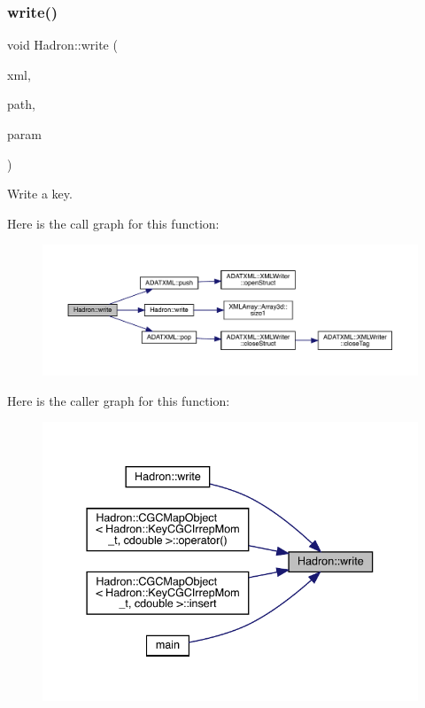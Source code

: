 \subsubsection{\texorpdfstring{write()}{write()}\hspace{0.1cm}{\footnotesize\ttfamily [24/95]}}
{\footnotesize\ttfamily void Hadron\+::write (\begin{DoxyParamCaption}\item[{\mbox{\hyperlink{classADATXML_1_1XMLWriter}{X\+M\+L\+Writer}} \&}]{xml,  }\item[{const std\+::string \&}]{path,  }\item[{const \mbox{\hyperlink{structHadron_1_1KeyBaryonElementalOperator__t}{Key\+Baryon\+Elemental\+Operator\+\_\+t}} \&}]{param }\end{DoxyParamCaption})}



Write a key. 

Here is the call graph for this function\+:
\nopagebreak
\begin{figure}[H]
\begin{center}
\leavevmode
\includegraphics[width=350pt]{d1/daf/namespaceHadron_ac358b1203bd94f6b26452402911ce174_cgraph}
\end{center}
\end{figure}
Here is the caller graph for this function\+:
\nopagebreak
\begin{figure}[H]
\begin{center}
\leavevmode
\includegraphics[width=337pt]{d1/daf/namespaceHadron_ac358b1203bd94f6b26452402911ce174_icgraph}
\end{center}
\end{figure}
\mbox{\label{namespaceHadron_a4ae7852bf18d56cb1a966ce318245ea6}} 
